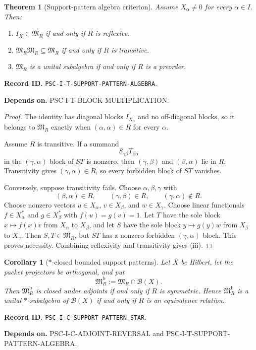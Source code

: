 \documentclass[11pt]{article}
\newtheorem{theorem}{Theorem}[section]
\newtheorem{corollary}[corollary]{Corollary}
\theoremstyle{definition}
\theoremstyle{remark}
\newcommand{\RecordID}[1]{\par\smallskip\noindent\begingroup\footnotesize\color{PSCGray}\raggedright\textbf{Record ID.} \nolinkurl{#1}.\par\endgroup}
\newcommand{\Depends}[1]{\par\noindent\begingroup\footnotesize\color{PSCGray}\raggedright\textbf{Depends on.} #1\par\endgroup}
\begin{document}
\begin{theorem}[Support-pattern algebra criterion]
\label{thm:support-pattern}
Assume $X_\alpha\neq0$ for every $\alpha\in I$.  Then:
\begin{enumerate}[label=(\roman*)]
\item $I_X\in\mathfrak M_R$ if and only if $R$ is reflexive.
\item $\mathfrak M_R\mathfrak M_R\subseteq\mathfrak M_R$ if and only if $R$ is transitive.
\item $\mathfrak M_R$ is a unital subalgebra if and only if $R$ is a preorder.
\end{enumerate}
\end{theorem}
\RecordID{PSC-I-T-SUPPORT-PATTERN-ALGEBRA}
\Depends{PSC-I-T-BLOCK-MULTIPLICATION.}

\begin{proof}
The identity has diagonal blocks $I_{X_\alpha}$ and no off-diagonal blocks, so it belongs to $\mathfrak M_R$ exactly when $(\alpha,\alpha)\in R$ for every $\alpha$.

Assume $R$ is transitive.  If a summand
\[
S_{\gamma\beta}T_{\beta\alpha}
\]
in the $(\gamma,\alpha)$ block of $ST$ is nonzero, then $(\gamma,\beta)$ and $(\beta,\alpha)$ lie in $R$.  Transitivity gives $(\gamma,\alpha)\in R$, so every forbidden block of $ST$ vanishes.

Conversely, suppose transitivity fails.  Choose $\alpha,\beta,\gamma$ with
\[
(\beta,\alpha)\in R,
\qquad
(\gamma,\beta)\in R,
\qquad
(\gamma,\alpha)\notin R.
\]
Choose nonzero vectors $u\in X_\alpha$, $v\in X_\beta$, and $w\in X_\gamma$.  Choose linear functionals $f\in X_\alpha^*$ and $g\in X_\beta^*$ with $f(u)=g(v)=1$.  Let $T$ have the sole block $x\mapsto f(x)v$ from $X_\alpha$ to $X_\beta$, and let $S$ have the sole block $y\mapsto g(y)w$ from $X_\beta$ to $X_\gamma$.  Then $S,T\in\mathfrak M_R$, but $ST$ has a nonzero forbidden $(\gamma,\alpha)$ block.  This proves necessity.  Combining reflexivity and transitivity gives (iii).
\end{proof}

\begin{corollary}[$*$-closed bounded support patterns]
\label{cor:star-support}
Let $X$ be Hilbert, let the packet projectors be orthogonal, and put
\[
\mathfrak M_R^{\mathrm b}:=\mathfrak M_R\cap\mathcal B(X).
\]
Then $\mathfrak M_R^{\mathrm b}$ is closed under adjoints if and only if $R$ is symmetric.  Hence $\mathfrak M_R^{\mathrm b}$ is a unital $*$-subalgebra of $\mathcal B(X)$ if and only if $R$ is an equivalence relation.
\end{corollary}
\RecordID{PSC-I-C-SUPPORT-PATTERN-STAR}
\Depends{PSC-I-C-ADJOINT-REVERSAL and PSC-I-T-SUPPORT-PATTERN-ALGEBRA.}
\end{document}

